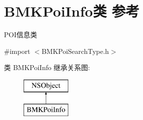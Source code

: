 \hypertarget{interface_b_m_k_poi_info}{}\section{B\+M\+K\+Poi\+Info类 参考}
\label{interface_b_m_k_poi_info}


P\+O\+I信息类  




{\ttfamily \#import $<$B\+M\+K\+Poi\+Search\+Type.\+h$>$}

类 B\+M\+K\+Poi\+Info 继承关系图\+:\begin{figure}[H]
\begin{center}
\leavevmode
\includegraphics[height=2.000000cm]{interface_b_m_k_poi_info}
\end{center}
\end{figure}
